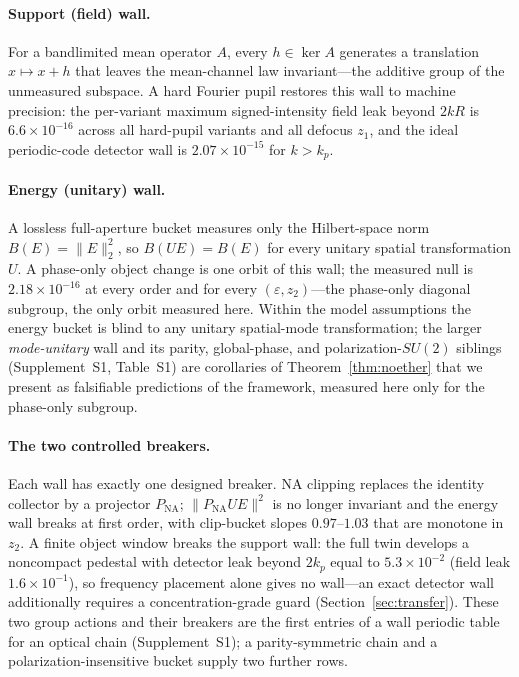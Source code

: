 \documentclass[10pt,twocolumn]{article}
\theoremstyle{plain}
\theoremstyle{definition}
\newcommand{\eps}{\varepsilon}
\begin{document}
\paragraph{Support (field) wall.}
For a bandlimited mean operator $A$, every $h\in\ker A$ generates a translation
$x\mapsto x+h$ that leaves the mean-channel law invariant---the additive group of
the unmeasured subspace. A hard Fourier pupil restores this wall to machine
precision: the per-variant maximum signed-intensity field leak beyond $2kR$ is
$6.6\times10^{-16}$ across all hard-pupil variants and all defocus $z_1$, and the
ideal periodic-code detector wall is $2.07\times10^{-15}$ for $k>k_p$.

\paragraph{Energy (unitary) wall.}
A lossless full-aperture bucket measures only the Hilbert-space norm
$B(E)=\lVert E\rVert_2^2$, so $B(UE)=B(E)$ for every unitary spatial transformation
$U$. A phase-only object change is one orbit of this wall; the measured null is
$2.18\times10^{-16}$ at every order and for every $(\eps,z_2)$---the phase-only
diagonal subgroup, the only orbit measured here. Within the model assumptions the
energy bucket is blind to any unitary spatial-mode transformation; the larger
\emph{mode-unitary} wall and its parity, global-phase, and polarization-$SU(2)$
siblings (Supplement~S1, Table~S1) are corollaries of Theorem~\ref{thm:noether} that
we present as falsifiable predictions of the framework, measured here only for the
phase-only subgroup.

\paragraph{The two controlled breakers.}
Each wall has exactly one designed breaker. NA clipping replaces the identity
collector by a projector $P_{\mathrm{NA}}$; $\lVert P_{\mathrm{NA}}UE\rVert^2$ is
no longer invariant and the energy wall breaks at first order, with clip-bucket
slopes $0.97$--$1.03$ that are monotone in $z_2$. A finite object window breaks the
support wall: the full twin develops a noncompact pedestal with detector leak
beyond $2k_p$ equal to $5.3\times10^{-2}$ (field leak $1.6\times10^{-1}$), so
frequency placement alone gives no wall---an exact detector wall additionally
requires a concentration-grade guard (Section~\ref{sec:transfer}). These two
group actions and their breakers are the first entries of a wall periodic table
for an optical chain (Supplement~S1); a parity-symmetric chain and a
polarization-insensitive bucket supply two further rows.
\end{document}

